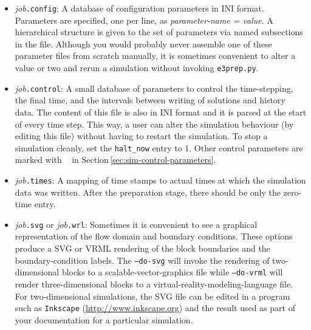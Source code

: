 \documentclass[12pt,a4paper,twoside]{article}
\begin{document}
         \begin{itemize}
           \item \textit{job}\texttt{.config}: 
             A database of configuration parameters in INI format.
             Parameters are specified, one per line, as \textit{parameter-name = value}.
             A hierarchical structure is given to the set of parameters via
             named subsections in the file.
             Although you would probably never assemble one of these parameter files
             from scratch manually, it is sometimes convenient to alter a value or two and rerun
             a simulation without invoking \texttt{e3prep.py}.
           \item \textit{job}\texttt{.control}: 
             A small database of parameters to control the time-stepping, the final time,
             and the intervals between writing of solutions and history data.
             The content of this file is also in INI format and it is parsed at the
             start of every time step.
             This way, a user can alter the simulation behaviour (by editing this file)
             without having to restart the simulation.
             To stop a simulation cleanly, set the \texttt{halt\_now} entry to 1.
             Other control parameters are marked with \ddag~ in Section\,\ref{sec:sim-control-parameters}.
           \item  \textit{job}\texttt{.times}:
             A mapping of time stamps to actual times at which the simulation
             data was written.
             After the preparation stage, there should be only the zero-time entry.
           \item \textit{job}\texttt{.svg} or \textit{job}\texttt{.wrl}:  
             Sometimes it is convenient to see a graphical representation of the flow domain 
             and boundary conditions.
             These options produce a SVG or VRML rendering of the block boundaries 
             and the boundary-condition labels.
             The \texttt{--do-svg} will invoke the rendering of two-dimensional blocks
             to a scalable-vector-graphics file while \texttt{--do-vrml} will render 
             three-dimensional blocks to a virtual-reality-modeling-language file.
             For two-dimensional simulations, the SVG file can be edited in a program such as \texttt{Inkscape}
             (\url{http://www.inkscape.org})
             and the result used as part of your documentation for a particular simulation.

\end{itemize}
\end{document}
